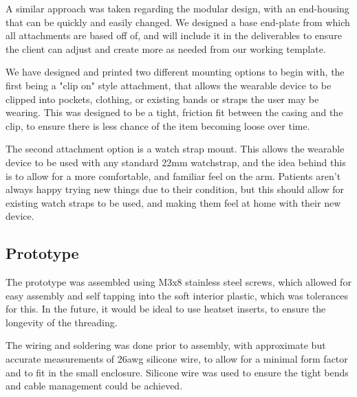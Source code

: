 
            A similar approach was taken regarding the modular design, with an end-housing that can be quickly and easily changed. We designed a base end-plate from which all attachments are based off of, and will include it in the deliverables to ensure the client can adjust and create more as needed from our working template.

            

            We have designed and printed two different mounting options to begin with, the first being a "clip on" style attachment, that allows the wearable device to be clipped into pockets, clothing, or existing bands or straps the user may be wearing. This was designed to be a tight, friction fit between the casing and the clip, to ensure there is less chance of the item becoming loose over time.

            

            The second attachment option is a watch strap mount. This allows the wearable device to be used with any standard 22mm watchstrap, and the idea behind this is to allow for a more comfortable, and familiar feel on the arm. Patients aren't always happy trying new things due to their condition, but this should allow for existing watch straps to be used, and making them feel at home with their new device.

            

        \subsection{Prototype}
        \label{subsec:Prototype_wearable}

            The prototype was assembled using M3x8 stainless steel screws, which allowed for easy assembly and self tapping into the soft interior plastic, which was tolerances for this. In the future, it would be ideal to use heatset inserts, to ensure the longevity of the threading.

            

            The wiring and soldering was done prior to assembly, with approximate but accurate measurements of 26awg silicone wire, to allow for a minimal form factor and to fit in the small enclosure. Silicone wire was used to ensure the tight bends and cable management could be achieved.

